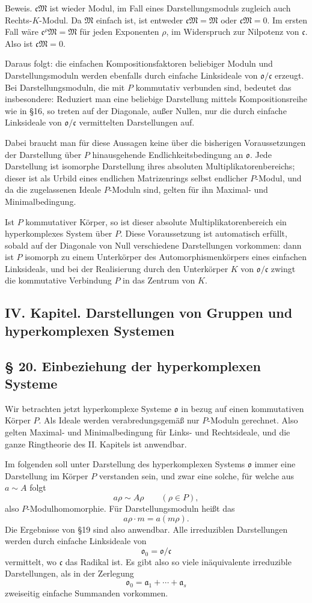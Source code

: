 \documentclass[11pt]{article}
\providecommand{\mM}{\mathfrak{M}}
\providecommand{\mo}{\mathfrak{o}}
\providecommand{\ma}{\mathfrak{a}}
\providecommand{\mc}{\mathfrak{c}}
\begin{document}
Beweis. $\mc\mM$ ist wieder Modul, im Fall eines Darstellungsmoduls zugleich auch Rechts-$K$-Modul. Da $\mM$ einfach ist, ist entweder $\mc\mM=\mM$ oder $\mc\mM=0$. Im ersten Fall wäre $\mc^\rho\mM=\mM$ für jeden Exponenten $\rho$, im Widerspruch zur Nilpotenz von $\mc$. Also ist $\mc\mM=0$.

Daraus folgt: die einfachen Kompositionsfaktoren beliebiger Moduln und Darstellungsmoduln werden ebenfalls durch einfache Linksideale von $\mo/\mc$ erzeugt. Bei Darstellungsmoduln, die mit $P$ kommutativ verbunden sind, bedeutet das insbesondere: Reduziert man eine beliebige Darstellung mittels Kompositionsreihe wie in §16, so treten auf der Diagonale, außer Nullen, nur die durch einfache Linksideale von $\mo/\mc$ vermittelten Darstellungen auf.

Dabei braucht man für diese Aussagen keine über die bisherigen Voraussetzungen der Darstellung über $P$ hinausgehende Endlichkeitsbedingung an $\mo$. Jede Darstellung ist isomorphe Darstellung ihres absoluten Multiplikatorenbereichs; dieser ist als Urbild eines endlichen Matrizenrings selbst endlicher $P$-Modul, und da die zugelassenen Ideale $P$-Moduln sind, gelten für ihn Maximal- und Minimalbedingung.

Ist $P$ kommutativer Körper, so ist dieser absolute Multiplikatorenbereich ein hyperkomplexes System über $P$. Diese Voraussetzung ist automatisch erfüllt, sobald auf der Diagonale von Null verschiedene Darstellungen vorkommen: dann ist $P$ isomorph zu einem Unterkörper des Automorphismenkörpers eines einfachen Linksideals, und bei der Realisierung durch den Unterkörper $K$ von $\mo/\mc$ zwingt die kommutative Verbindung $P$ in das Zentrum von $K$.

\subsection*{IV. Kapitel. Darstellungen von Gruppen und hyperkomplexen Systemen}

\subsection*{§ 20. Einbeziehung der hyperkomplexen Systeme}
Wir betrachten jetzt hyperkomplexe Systeme $\mo$ in bezug auf einen kommutativen Körper $P$. Als Ideale werden verabredungsgemäß nur $P$-Moduln gerechnet. Also gelten Maximal- und Minimalbedingung für Links- und Rechtsideale, und die ganze Ringtheorie des II. Kapitels ist anwendbar.

Im folgenden soll unter Darstellung des hyperkomplexen Systems $\mo$ immer eine Darstellung im Körper $P$ verstanden sein, und zwar eine solche, für welche aus $a\sim A$ folgt
\[
        a\rho\sim A\rho\qquad(\rho\in P),
\]
also $P$-Modulhomomorphie. Für Darstellungsmoduln heißt das
\[
        a\rho\cdot m=a(m\rho).
\]
Die Ergebnisse von §19 sind also anwendbar. Alle irreduziblen Darstellungen werden durch einfache Linksideale von
\[
        \mo_0=\mo/\mc
\]
vermittelt, wo $\mc$ das Radikal ist. Es gibt also so viele inäquivalente irreduzible Darstellungen, als in der Zerlegung
\[
        \mo_0=\ma_1+\cdots+\ma_s
\]
zweiseitig einfache Summanden vorkommen.
\end{document}
